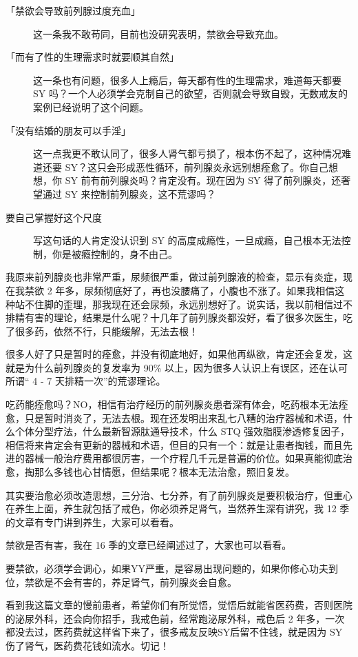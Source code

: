 \documentclass[fontset=founder]{ctexart}
\begin{document}
\begin{description}
    \item[「禁欲会导致前列腺过度充血」] 这一条我不敢苟同，目前也没研究表明，禁欲会导致充血。
    \item[「而有了性的生理需求时就要顺其自然」] 这一条也有问题，很多人上瘾后，每天都有性的生理需求，难道每天都要 SY 吗？一个人必须学会克制自己的欲望，否则就会导致自毁，无数戒友的案例已经说明了这个问题。
    \item[「没有结婚的朋友可以手淫」] 这一点我更不敢认同了，很多人肾气都亏损了，根本伤不起了，这种情况难道还要 SY？这只会形成恶性循环，前列腺炎永远别想痊愈了。你自己想想，你 SY 前有前列腺炎吗？肯定没有。现在因为 SY 得了前列腺炎，还奢望通过 SY 来控制前列腺炎，这不荒谬吗？
    \item[要自己掌握好这个尺度] 写这句话的人肯定没认识到 SY 的高度成瘾性，一旦成瘾，自己根本无法控制，你是被瘾控制的，身不由己。
\end{description}

我原来前列腺炎也非常严重，尿频很严重，做过前列腺液的检查，显示有炎症，现在我禁欲 2 年多，尿频彻底好了，再也没腰痛了，小腹也不涨了。如果我相信这种站不住脚的歪理，那我现在还会尿频，永远别想好了。说实话，我以前相信过不排精有害的理论，结果是什么呢？十几年了前列腺炎都没好，看了很多次医生，吃了很多药，依然不行，只能缓解，无法去根！

很多人好了只是暂时的痊愈，并没有彻底地好，如果他再纵欲，肯定还会复发，这就是为什么前列腺炎的复发率为 90\% 以上，因为很多人认识上有误区，还在认可所谓“ 4 - 7 天排精一次”的荒谬理论。

吃药能痊愈吗？NO，相信有治疗经历的前列腺炎患者深有体会，吃药根本无法痊愈，只是暂时消炎了，无法去根。现在还发明出来乱七八糟的治疗器械和术语，什么个体分型疗法，什么最新智源肽通导技术，什么 STQ 强效脂膜渗透修复因子，相信将来肯定会有更新的器械和术语，但目的只有一个：就是让患者掏钱，而且先进的器械一般治疗费用都很厉害，一个疗程几千元是普遍的价位。如果真能彻底治愈，掏那么多钱也心甘情愿，但结果呢？根本无法治愈，照旧复发。

其实要治愈必须改造思想，三分治、七分养，有了前列腺炎是要积极治疗，但重心在养生上面，养生就包括了戒色，你必须养足肾气，当然养生深有讲究，我 12 季的文章有专门讲到养生，大家可以看看。

禁欲是否有害，我在 16 季的文章已经阐述过了，大家也可以看看。

要禁欲，必须学会调心，如果YY严重，是容易出现问题的，如果你修心功夫到位，禁欲是不会有害的，养足肾气，前列腺炎会自愈。

看到我这篇文章的慢前患者，希望你们有所觉悟，觉悟后就能省医药费，否则医院的泌尿外科，还会向你招手，我戒色前，经常跑泌尿外科，戒色后 2 年多，一次都没去过，医药费就这样省下来了，很多戒友反映SY后留不住钱，就是因为 SY 伤了肾气，医药费花钱如流水。切记！
\end{document}
